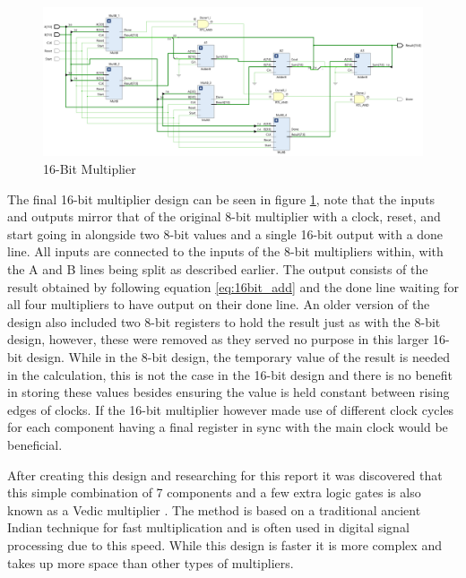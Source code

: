 \documentclass[11pt]{article}
\begin{document}
\begin{figure}[H]         
    \centering
    \includegraphics[width=\textwidth]{16bit.png}
    \caption{16-Bit Multiplier}
    \label{fig:8bit}
\end{figure} 

The final 16-bit multiplier design can be seen in figure \ref{fig:8bit},
note that the inputs and outputs mirror that of the original 8-bit multiplier with a clock, reset, and start going in alongside two 8-bit values and a single 16-bit output with a done line.
All inputs are connected to the inputs of the 8-bit multipliers within, with the A and B lines being split as described earlier. 
The output consists of the result obtained by following equation \ref{eq:16bit_add} and the done line waiting for all four multipliers to have output on their done line.
An older version of the design also included two 8-bit registers to hold the result just as with the 8-bit design, however, these were removed as they served no purpose in this larger 16-bit design.
While in the 8-bit design, the temporary value of the result is needed in the calculation, this is not the case in the 16-bit design and there is no benefit in storing these values besides ensuring the value is held constant between rising edges of clocks.
If the 16-bit multiplier however made use of different clock cycles for each component having a final register in sync with the main clock would be beneficial.

After creating this design and researching for this report it was discovered that this simple combination of 7 components and a few extra logic gates is also known as a Vedic multiplier \cite{vedic}.
The method is based on a traditional ancient Indian technique for fast multiplication and is often used in digital signal processing due to this speed.
While this design is faster it is more complex and takes up more space than other types of multipliers.
\end{document}
